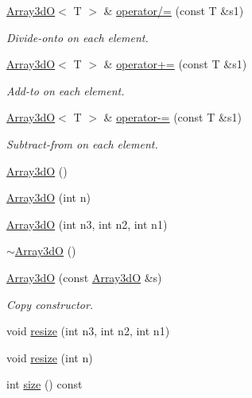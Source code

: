 \begin{DoxyCompactItemize}
\mbox{\hyperlink{classADAT_1_1Array3dO}{Array3dO}}$<$ T $>$ \& \mbox{\hyperlink{classADAT_1_1Array3dO_a9d82ba391c67603f43b112c945532de6}{operator/=}} (const T \&s1)
\begin{DoxyCompactList}\small\item\em Divide-\/onto on each element. \end{DoxyCompactList}\item 
\mbox{\hyperlink{classADAT_1_1Array3dO}{Array3dO}}$<$ T $>$ \& \mbox{\hyperlink{classADAT_1_1Array3dO_a6e5f624a1a14555b030d5fb53cb85f9c}{operator+=}} (const T \&s1)
\begin{DoxyCompactList}\small\item\em Add-\/to on each element. \end{DoxyCompactList}\item 
\mbox{\hyperlink{classADAT_1_1Array3dO}{Array3dO}}$<$ T $>$ \& \mbox{\hyperlink{classADAT_1_1Array3dO_a0341b7ddc224910074b55646bca45e2a}{operator-\/=}} (const T \&s1)
\begin{DoxyCompactList}\small\item\em Subtract-\/from on each element. \end{DoxyCompactList}\item 
\mbox{\hyperlink{classADAT_1_1Array3dO_aaf7d69b08f7c9e5c01a123da7f52b8d1}{Array3dO}} ()
\item 
\mbox{\hyperlink{classADAT_1_1Array3dO_a4546b7e563774cfcdbe0be19cabbb854}{Array3dO}} (int n)
\item 
\mbox{\hyperlink{classADAT_1_1Array3dO_aed93788a8b6356d91260f6a5afa80f9b}{Array3dO}} (int n3, int n2, int n1)
\item 
\mbox{\hyperlink{classADAT_1_1Array3dO_a71c38217f7d5663f7a067733b9040274}{$\sim$\+Array3dO}} ()
\item 
\mbox{\hyperlink{classADAT_1_1Array3dO_aca48914514856bcde242c27bce944040}{Array3dO}} (const \mbox{\hyperlink{classADAT_1_1Array3dO}{Array3dO}} \&s)
\begin{DoxyCompactList}\small\item\em Copy constructor. \end{DoxyCompactList}\item 
void \mbox{\hyperlink{classADAT_1_1Array3dO_ac2ad038aba5cf35770c319cb199cd438}{resize}} (int n3, int n2, int n1)
\item 
void \mbox{\hyperlink{classADAT_1_1Array3dO_ade806f07a366f5217783998dda678b6f}{resize}} (int n)
\item 
int \mbox{\hyperlink{classADAT_1_1Array3dO_a44da6abc6d1597d9df0b983691b952fc}{size}} () const

\end{DoxyCompactItemize}
